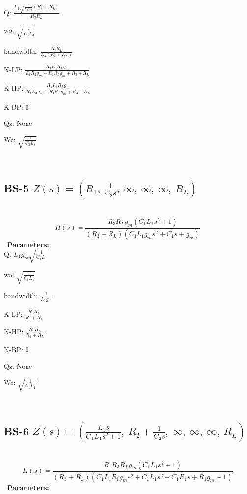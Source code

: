 \documentclass{article}
\begin{document}
Q: $\frac{L_{3} \sqrt{\frac{1}{C_{3} L_{3}}} \left(R_{3} + R_{L}\right)}{R_{3} R_{L}}$\ 

wo: $\sqrt{\frac{1}{C_{3} L_{3}}}$\ 

bandwidth: $\frac{R_{3} R_{L}}{L_{3} \left(R_{3} + R_{L}\right)}$\ 

K-LP: $\frac{R_{1} R_{3} R_{L} g_{m}}{R_{1} R_{3} g_{m} + R_{1} R_{L} g_{m} + R_{3} + R_{L}}$\ 

K-HP: $\frac{R_{1} R_{3} R_{L} g_{m}}{R_{1} R_{3} g_{m} + R_{1} R_{L} g_{m} + R_{3} + R_{L}}$\ 

K-BP: $0$\ 

Qz: $\text{None}$\ 

Wz: $\sqrt{\frac{1}{C_{3} L_{3}}}$\ 

\ 

\subsection{BS-5 $Z(s) = \left( R_{1}, \  \frac{1}{C_{2} s}, \  \infty, \  \infty, \  \infty, \  R_{L}\right)$ } \ 
\textbf{\[H(s) = \frac{R_{3} R_{L} g_{m} \left(C_{1} L_{1} s^{2} + 1\right)}{\left(R_{3} + R_{L}\right) \left(C_{1} L_{1} g_{m} s^{2} + C_{1} s + g_{m}\right)}\] } \ 
\textbf{Parameters:}\\ 

Q: $L_{1} g_{m} \sqrt{\frac{1}{C_{1} L_{1}}}$\ 

wo: $\sqrt{\frac{1}{C_{1} L_{1}}}$\ 

bandwidth: $\frac{1}{L_{1} g_{m}}$\ 

K-LP: $\frac{R_{3} R_{L}}{R_{3} + R_{L}}$\ 

K-HP: $\frac{R_{3} R_{L}}{R_{3} + R_{L}}$\ 

K-BP: $0$\ 

Qz: $\text{None}$\ 

Wz: $\sqrt{\frac{1}{C_{1} L_{1}}}$\ 

\ 

\subsection{BS-6 $Z(s) = \left( \frac{L_{1} s}{C_{1} L_{1} s^{2} + 1}, \  R_{2} + \frac{1}{C_{2} s}, \  \infty, \  \infty, \  \infty, \  R_{L}\right)$ } \ 
\textbf{\[H(s) = \frac{R_{1} R_{3} R_{L} g_{m} \left(C_{1} L_{1} s^{2} + 1\right)}{\left(R_{3} + R_{L}\right) \left(C_{1} L_{1} R_{1} g_{m} s^{2} + C_{1} L_{1} s^{2} + C_{1} R_{1} s + R_{1} g_{m} + 1\right)}\] } \ 
\textbf{Parameters:}\\ 
\end{document}
